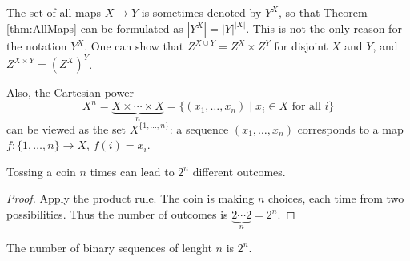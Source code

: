\begin{page}
\setcounter{section}{2}
\setcounter{subsection}{2}
\setcounter{dfn}{4}
\label{portion:32}

\begin{rem}
The set of all maps $X \to Y$ is sometimes denoted by $Y^X$, so that Theorem \ref{thm:AllMaps} can be formulated as $\left|Y^X\right| = |Y|^{|X|}$.
This is not the only reason for the notation $Y^X$.
One can show that $Z^{X \cup Y} = Z^X \times Z^Y$ for disjoint $X$ and $Y$, and $Z^{X \times Y} = (Z^X)^Y$.

Also, the Cartesian power
\[
X^n = \underbrace{X \times \cdots \times X}_{n} = \{(x_1, \ldots, x_n) \mid x_i \in X \text{ for all }i\}
\]
can be viewed as the set $X^{\{1, \ldots, n\}}$:
a sequence $(x_1, \ldots, x_n)$ corresponds to a map $f \colon \{1, \ldots, n\} \to X$, $f(i) = x_i$.
\end{rem}

\end{page}

\begin{page}
\setcounter{section}{2}
\setcounter{subsection}{2}
\setcounter{dfn}{5}
\label{portion:35}

\begin{thm}
Tossing a coin $n$ times can lead to $2^n$ different outcomes.
\end{thm}

\end{page}

\begin{page}
\setcounter{section}{2}
\setcounter{subsection}{2}
\setcounter{dfn}{5}
\label{portion:36}

\begin{proof}
Apply the product rule.
The coin is making $n$ choices, each time from two possibilities.
Thus the number of outcomes is $\underbrace{2  \cdots  2}_n = 2^n$.
\end{proof}


\end{page}

\begin{page}
\setcounter{section}{2}
\setcounter{subsection}{2}
\setcounter{dfn}{6}
\label{portion:38}

\begin{thm}
The number of binary sequences of lenght $n$ is $2^n$.
\end{thm}

\end{page}

